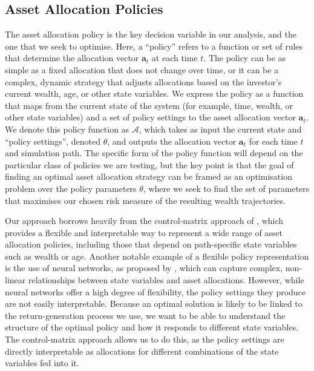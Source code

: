 \documentclass[11pt]{article}
\begin{document}
\subsection{Asset Allocation Policies}

The asset allocation policy is the key decision variable in our analysis, and the one that we seek to optimise. Here, a ``policy'' refers to a function or set of rules that determine the allocation vector \(\mathbf{a}_t\) at each time \(t\). The policy can be as simple as a fixed allocation that does not change over time, or it can be a complex, dynamic strategy that adjusts allocations based on the investor's current wealth, age, or other state variables. We express the policy as a function that maps from the current state of the system (for example, time, wealth, or other state variables) and a set of policy settings to the asset allocation vector \(\mathbf{a}_t\). We denote this policy function as \(\mathcal{A}\), which takes as input the current state and ``policy settings'', denoted \(\theta\), and outputs the allocation vector \(\mathbf{a}_t\) for each time \(t\) and simulation path. The specific form of the policy function will depend on the particular class of policies we are testing, but the key point is that the goal of finding an optimal asset allocation strategy can be framed as an optimisation problem over the policy parameters \(\theta\), where we seek to find the set of parameters that maximises our chosen risk measure of the resulting wealth trajectories.

Our approach borrows heavily from the control-matrix approach of \textcite{Makinen2024}, which provides a flexible and interpretable way to represent a wide range of asset allocation policies, including those that depend on path-specific state variables such as wealth or age. Another notable example of a flexible policy representation is the use of neural networks, as proposed by \textcite{parker2024simple}, which can capture complex, non-linear relationships between state variables and asset allocations. However, while neural networks offer a high degree of flexibility, the policy settings they produce are not easily interpretable. Because an optimal solution is likely to be linked to the return-generation process we use, we want to be able to understand the structure of the optimal policy and how it responds to different state variables. The control-matrix approach allows us to do this, as the policy settings are directly interpretable as allocations for different combinations of the state variables fed into it.
\end{document}
